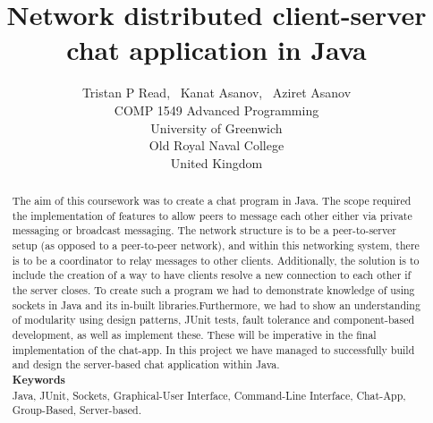 \documentclass{COMPXXXX}
\begin{document}
\title {Network distributed client-server chat application in Java}

\author {Tristan P Read,~
Kanat Asanov,~
Aziret Asanov\\
\hspace
    COMP 1549 Advanced Programming\\
	University of Greenwich\\
Old Royal Naval College\\
United Kingdom
        }

\maketitle


\begin{abstract}

\normalsize \textrm {The aim of this coursework was to create a chat program in Java. The scope required the implementation of features to allow peers to message each other either via private messaging or broadcast messaging. The network structure is to be a peer-to-server setup (as opposed to a peer-to-peer network), and within this networking system, there is to be a coordinator to relay messages to other clients. Additionally, the solution is to include the creation of a way to have clients resolve a new connection to each other if the server closes. To create such a program we had to demonstrate knowledge of using sockets in Java and its in-built libraries.Furthermore, we had to show an understanding of modularity using design patterns, JUnit tests, fault tolerance and component-based development, as well as implement these. These will be imperative in the final implementation of the chat-app. In this project we have managed to successfully build and design the server-based chat application within Java.}\\
\textbf{Keywords}\\
\normalsize \textrm {Java, JUnit, Sockets, Graphical-User Interface, Command-Line Interface, Chat-App, Group-Based, Server-based.}

\end{abstract}
\end{document}
